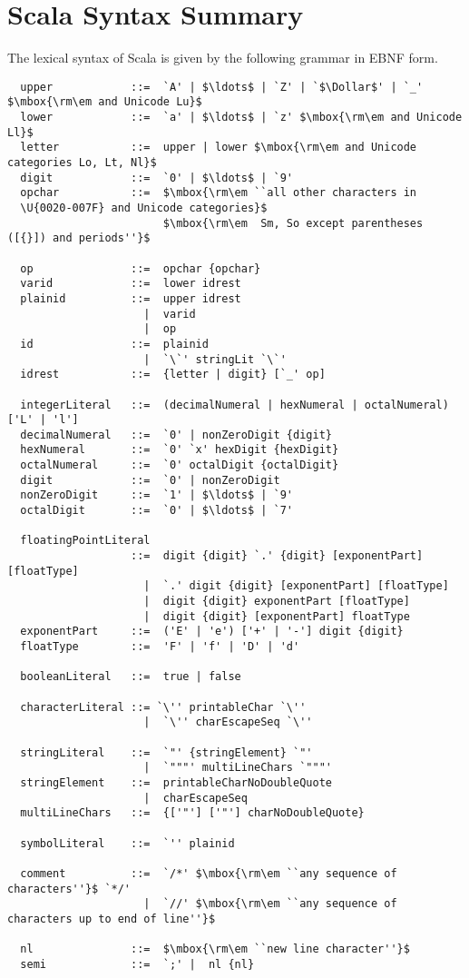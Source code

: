 \chapter{Scala Syntax Summary}\label{sec:syntax}

The lexical syntax of Scala is given by the following grammar in EBNF
form.

{\small
\begin{lstlisting}
  upper            ::=  `A' | $\ldots$ | `Z' | `$\Dollar$' | `_' $\mbox{\rm\em and Unicode Lu}$
  lower            ::=  `a' | $\ldots$ | `z' $\mbox{\rm\em and Unicode Ll}$
  letter           ::=  upper | lower $\mbox{\rm\em and Unicode categories Lo, Lt, Nl}$
  digit            ::=  `0' | $\ldots$ | `9'
  opchar           ::=  $\mbox{\rm\em ``all other characters in
  \U{0020-007F} and Unicode categories}$
                        $\mbox{\rm\em  Sm, So except parentheses ([{}]) and periods''}$

  op               ::=  opchar {opchar} 
  varid            ::=  lower idrest
  plainid          ::=  upper idrest
                     |  varid
                     |  op
  id               ::=  plainid
                     |  `\`' stringLit `\`'
  idrest           ::=  {letter | digit} [`_' op]

  integerLiteral   ::=  (decimalNumeral | hexNumeral | octalNumeral) ['L' | 'l']
  decimalNumeral   ::=  `0' | nonZeroDigit {digit}
  hexNumeral       ::=  `0' `x' hexDigit {hexDigit}
  octalNumeral     ::=  `0' octalDigit {octalDigit}
  digit            ::=  `0' | nonZeroDigit
  nonZeroDigit     ::=  `1' | $\ldots$ | `9'
  octalDigit       ::=  `0' | $\ldots$ | `7'

  floatingPointLiteral 
                   ::=  digit {digit} `.' {digit} [exponentPart] [floatType]
                     |  `.' digit {digit} [exponentPart] [floatType]
                     |  digit {digit} exponentPart [floatType]
                     |  digit {digit} [exponentPart] floatType
  exponentPart     ::=  ('E' | 'e') ['+' | '-'] digit {digit}
  floatType        ::=  'F' | 'f' | 'D' | 'd'

  booleanLiteral   ::=  true | false

  characterLiteral ::= `\'' printableChar `\''
                     |  `\'' charEscapeSeq `\''

  stringLiteral    ::=  `"' {stringElement} `"'
                     |  `"""' multiLineChars `"""'
  stringElement    ::=  printableCharNoDoubleQuote 
                     |  charEscapeSeq
  multiLineChars   ::=  {['"'] ['"'] charNoDoubleQuote}

  symbolLiteral    ::=  `'' plainid

  comment          ::=  `/*' $\mbox{\rm\em ``any sequence of characters''}$ `*/'
                     |  `//' $\mbox{\rm\em ``any sequence of characters up to end of line''}$

  nl               ::=  $\mbox{\rm\em ``new line character''}$
  semi             ::=  `;' |  nl {nl}       
\end{lstlisting}}

